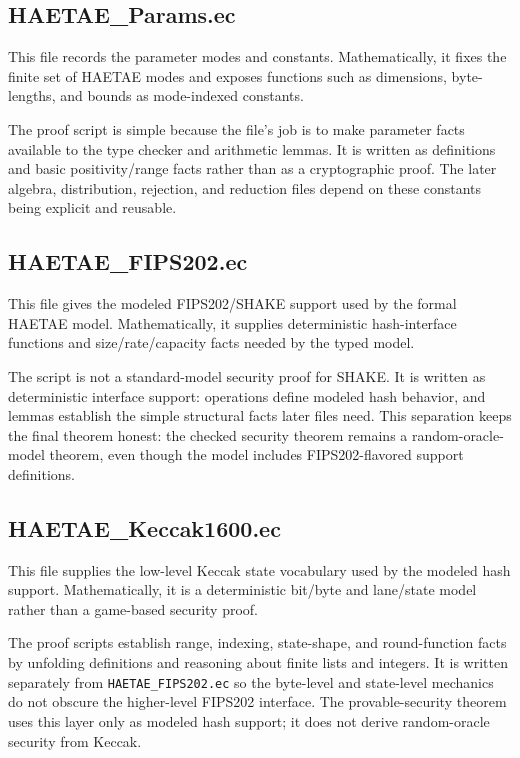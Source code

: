 \documentclass[11pt]{article}
\newcommand{\file}[1]{\nolinkurl{#1}}
\begin{document}
\subsection*{HAETAE\_Params.ec}

This file records the parameter modes and constants.  Mathematically, it fixes
the finite set of HAETAE modes and exposes functions such as dimensions,
byte-lengths, and bounds as mode-indexed constants.

The proof script is simple because the file's job is to make parameter facts
available to the type checker and arithmetic lemmas.  It is written as
definitions and basic positivity/range facts rather than as a cryptographic
proof.  The later algebra, distribution, rejection, and reduction files depend
on these constants being explicit and reusable.

\subsection*{HAETAE\_FIPS202.ec}

This file gives the modeled FIPS202/SHAKE support used by the formal HAETAE
model.  Mathematically, it supplies deterministic hash-interface functions and
size/rate/capacity facts needed by the typed model.

The script is not a standard-model security proof for SHAKE.  It is written as
deterministic interface support: operations define modeled hash behavior, and
lemmas establish the simple structural facts later files need.  This separation
keeps the final theorem honest: the checked security theorem remains a
random-oracle-model theorem, even though the model includes FIPS202-flavored
support definitions.

\subsection*{HAETAE\_Keccak1600.ec}

This file supplies the low-level Keccak state vocabulary used by the modeled
hash support.  Mathematically, it is a deterministic bit/byte and lane/state
model rather than a game-based security proof.

The proof scripts establish range, indexing, state-shape, and round-function
facts by unfolding definitions and reasoning about finite lists and integers.
It is written separately from \file{HAETAE_FIPS202.ec} so the byte-level and
state-level mechanics do not obscure the higher-level FIPS202 interface.  The
provable-security theorem uses this layer only as modeled hash support; it does
not derive random-oracle security from Keccak.
\end{document}
